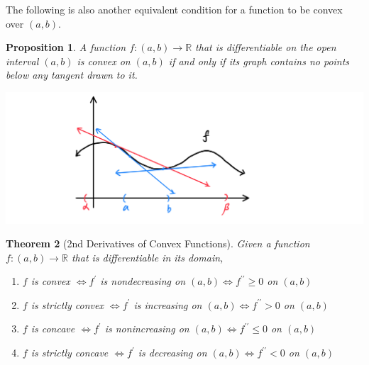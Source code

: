 \documentclass{article}
\newtheorem{theorem}{Theorem}[section]
\newtheorem{proposition}[theorem]{Proposition}
\theoremstyle{remark}
\theoremstyle{definition}
\begin{document}
The following is also another equivalent condition for a function to be convex over $(a, b)$. 

\begin{proposition}
A function $f: (a, b) \longrightarrow \mathbb{R}$ that is differentiable on the open interval $(a, b)$ is convex on $(a, b)$ if and only if its graph contains no points below any tangent drawn to it.
\begin{center}
    \includegraphics[scale=0.3]{img/Convex_Function_Over_Tangent_Line.PNG}
\end{center}
\end{proposition}

\begin{theorem}[2nd Derivatives of Convex Functions]
Given a function $f: (a, b) \longrightarrow \mathbb{R}$ that is differentiable in its domain, 
\begin{enumerate}
    \item $f$ is convex $\iff f^\prime$ is nondecreasing on $(a, b) \iff f^{\prime\prime} \geq 0$ on $(a, b)$ 
    \item $f$ is strictly convex $\iff f^\prime$ is increasing on $(a, b) \iff f^{\prime\prime} > 0$ on $(a, b)$ 
    \item $f$ is concave $\iff f^\prime$ is nonincreasing on $(a, b) \iff f^{\prime\prime} \leq 0$ on $(a, b)$ 
    \item $f$ is strictly concave $\iff f^\prime$ is decreasing on $(a, b) \iff f^{\prime\prime} < 0$ on $(a, b)$ 
\end{enumerate}
\end{theorem}
\end{document}
